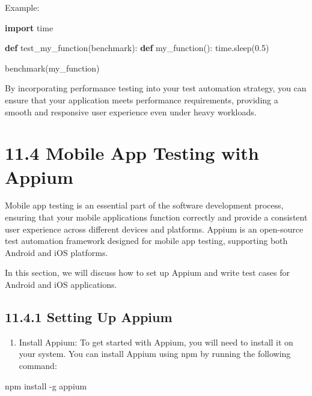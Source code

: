 \documentclass[
  paper=a4,
  ,captions=tableheading
]{scrartcl}
\newenvironment{Shaded}{}{}
\newcommand{\AttributeTok}[1]{\textcolor[rgb]{0.49,0.56,0.16}{#1}}
\newcommand{\ExtensionTok}[1]{#1}
\newcommand{\FloatTok}[1]{\textcolor[rgb]{0.25,0.63,0.44}{#1}}
\newcommand{\ImportTok}[1]{\textcolor[rgb]{0.00,0.50,0.00}{\textbf{#1}}}
\newcommand{\KeywordTok}[1]{\textcolor[rgb]{0.00,0.44,0.13}{\textbf{#1}}}
\newcommand{\NormalTok}[1]{#1}
\providecommand{\tightlist}{%
  \setlength{\itemsep}{0pt}\setlength{\parskip}{0pt}}
\begin{document}
Example:

\begin{Shaded}
\begin{Highlighting}[]
\ImportTok{import}\NormalTok{ time}

\KeywordTok{def}\NormalTok{ test\_my\_function(benchmark):}
    \KeywordTok{def}\NormalTok{ my\_function():}
\NormalTok{        time.sleep(}\FloatTok{0.5}\NormalTok{)}

\NormalTok{    benchmark(my\_function)}
\end{Highlighting}
\end{Shaded}

By incorporating performance testing into your test automation strategy,
you can ensure that your application meets performance requirements,
providing a smooth and responsive user experience even under heavy
workloads.

\hypertarget{mobile-app-testing-with-appium}{%
\section{11.4 Mobile App Testing with
Appium}\label{mobile-app-testing-with-appium}}

Mobile app testing is an essential part of the software development
process, ensuring that your mobile applications function correctly and
provide a consistent user experience across different devices and
platforms. Appium is an open-source test automation framework designed
for mobile app testing, supporting both Android and iOS platforms.

In this section, we will discuss how to set up Appium and write test
cases for Android and iOS applications.

\hypertarget{setting-up-appium}{%
\subsection{11.4.1 Setting Up Appium}\label{setting-up-appium}}

\begin{enumerate}
\def\labelenumi{\arabic{enumi}.}
\tightlist
\item
  Install Appium: To get started with Appium, you will need to install
  it on your system. You can install Appium using npm by running the
  following command:
\end{enumerate}

\begin{Shaded}
\begin{Highlighting}[]

\ExtensionTok{npm}\NormalTok{ install }\AttributeTok{{-}g}\NormalTok{ appium}
\end{Highlighting}
\end{Shaded}
\end{document}
